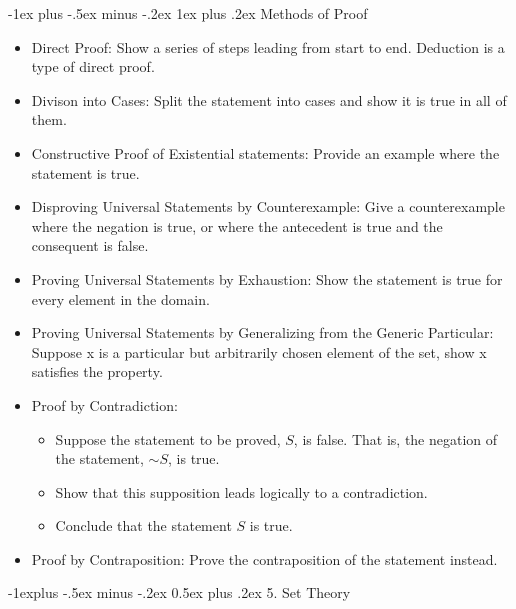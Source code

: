 \documentclass[10pt, portrait]{article}
\makeatletter
\renewcommand{\section}{\@startsection{section}{1}{0mm}%
                                {-1ex plus -.5ex minus -.2ex}%
                                {0.5ex plus .2ex}%
                                {\normalfont\large\bfseries}}
\renewcommand{\section}{\@startsection{section}{2}{0mm}%
                                {-1explus -.5ex minus -.2ex}%
                                {0.5ex plus .2ex}%
                                {\normalfont\normalsize\bfseries}}
\renewcommand{\subsection}{\@startsection{subsection}{3}{0mm}%
                                {-1ex plus -.5ex minus -.2ex}%
                                {1ex plus .2ex}%
                                {\normalfont\small\bfseries}}%
\renewcommand{\lnot}{\mathord{\sim}}
\makeatother
\begin{document}
\begin{multicols*}{2}
\subsection{Methods of Proof}
\begin{itemize}
    \item Direct Proof: Show a series of steps leading from start to end. Deduction is a type of direct proof.
    \item Divison into Cases: Split the statement into cases and show it is true in all of them.
    \item Constructive Proof of Existential statements: Provide an example where the statement is true.
    \item Disproving Universal Statements by Counterexample: Give a counterexample where the negation is true, or where the antecedent is true and the consequent is false.
    \item Proving Universal Statements by Exhaustion: Show the statement is true for every element in the domain.
    \item Proving Universal Statements by Generalizing from the Generic Particular: Suppose x is a particular but arbitrarily chosen element of the set, show x satisfies the property.
    \item Proof by Contradiction:
    \begin{itemize}
        \item Suppose the statement to be proved, $S$, is false. That is, the negation of the statement, $\lnot S$, is true.
        \item Show that this supposition leads logically to a contradiction.
        \item Conclude that the statement $S$ is true.
    \end{itemize}
    \item Proof by Contraposition: Prove the contraposition of the statement instead.
\end{itemize}

\section{5. Set Theory}

\end{multicols*}
\end{document}
